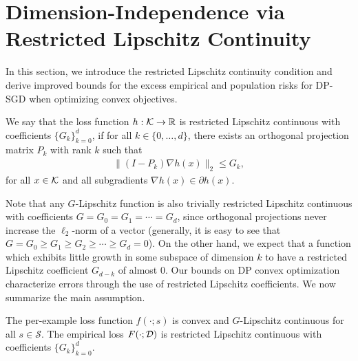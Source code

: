 \section{Dimension-Independence via Restricted Lipschitz Continuity}\label{sec:theory}
In this section, we introduce the restricted Lipschitz continuity condition and derive improved bounds for the excess empirical and population risks for DP-SGD when optimizing convex objectives.

\begin{defi}
We say that the loss function $h: \mathcal K \to \mathbb{R}$ is restricted Lipschitz continuous with coefficients $\{G_k\}_{k=0}^d$, if
for all $k \in \{0, \dots, d\}$, there exists an orthogonal projection matrix $P_k$ with rank $k$ such that 
\begin{align*}
    \|(I-P_k)\nabla h(x) \|_2\le G_k,
\end{align*}
for all $x \in \mathcal K$ and all subgradients $\nabla h(x) \in \partial h(x)$.
\end{defi}

Note that any $G$-Lipschitz function is also trivially restricted Lipschitz continuous with coefficients $G = G_0 = G_1 = \cdots = G_d$, since orthogonal projections never increase the $\ell_2$-norm of a vector (generally, it is easy to see that $G = G_{0}\ge G_{1}\geq G_{2}\geq\cdots\geq G_{d}=0$). 
On the other hand, we expect that a function which exhibits little growth in some subspace of dimension $k$ to have a restricted Lipschitz coefficient $G_{d-k}$ of almost 0.
Our bounds on DP convex optimization characterize errors through the use of restricted Lipschitz coefficients. 
We now summarize the main assumption.
\begin{assu}
\label{assm:G_k}
The per-example loss function $f(\cdot; s)$ is convex and $G$-Lipschitz continuous for all $s \in \mathcal{S}$.
The empirical loss $F(\cdot; \mathcal D)$ is restricted Lipschitz continuous with coefficients $\{G_k\}_{k = 0}^d$.
\end{assu}

